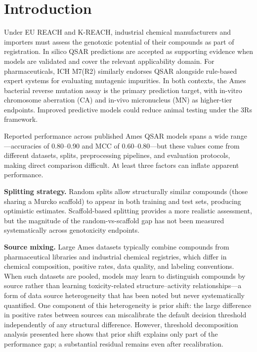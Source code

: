 \section{Introduction}

Under EU REACH\cite{EU_REACH_2006} and K-REACH,\cite{K_REACH_2018} industrial chemical 
manufacturers and importers must assess the genotoxic potential of their compounds as part 
of registration. In silico QSAR predictions are accepted as supporting evidence when models 
are validated and cover the relevant applicability domain.\cite{ECHA_QSAR_2008} For 
pharmaceuticals, ICH M7(R2) similarly endorses QSAR alongside rule-based expert systems 
for evaluating mutagenic impurities.\cite{ICH_M7_2017} In both contexts, the Ames bacterial 
reverse mutation assay\cite{Ames_1973,Mortelmans_2000} is the primary prediction target, 
with in-vitro chromosome aberration (CA) and in-vivo micronucleus 
(MN)\cite{OECD_473,OECD_474} as higher-tier endpoints. Improved predictive models could 
reduce animal testing under the 3Rs framework.\cite{Russell_Burch_1959}

Reported performance across published Ames QSAR models spans a wide range---accuracies of 
0.80--0.90 and MCC of 0.60--0.80\cite{Hansen_2009,Xu_2012,Honma_2019,Li_2021}---but these 
values come from different datasets, splits, preprocessing pipelines, and evaluation 
protocols, making direct comparison difficult. At least three factors can inflate apparent 
performance.

\textbf{Splitting strategy.} Random splits allow structurally similar compounds (those 
sharing a Murcko scaffold\cite{Bemis_Murcko_1996}) to appear in both training and test 
sets, producing optimistic estimates. Scaffold-based 
splitting\cite{Sheridan_2013,Wu_MoleculeNet_2018} provides a more realistic assessment, 
but the magnitude of the random-vs-scaffold gap has not been measured systematically across 
genotoxicity endpoints.

\textbf{Source mixing.} Large Ames datasets typically combine compounds from pharmaceutical 
libraries and industrial chemical registries,\cite{Hansen_2009,Honma_2019} which differ in 
chemical composition, positive rates, data quality, and labeling conventions. When such 
datasets are pooled, models may learn to distinguish compounds by source rather than 
learning toxicity-related structure--activity relationships---a form of data source 
heterogeneity that has been noted\cite{Tropsha_2010,Hanser_2016} but never systematically 
quantified. One component of 
this heterogeneity is prior shift: the large difference in positive rates between sources 
can miscalibrate the default decision threshold independently of any structural difference. 
However, threshold decomposition analysis presented here shows that prior shift explains 
only part of the performance gap; a substantial residual remains even after recalibration.

